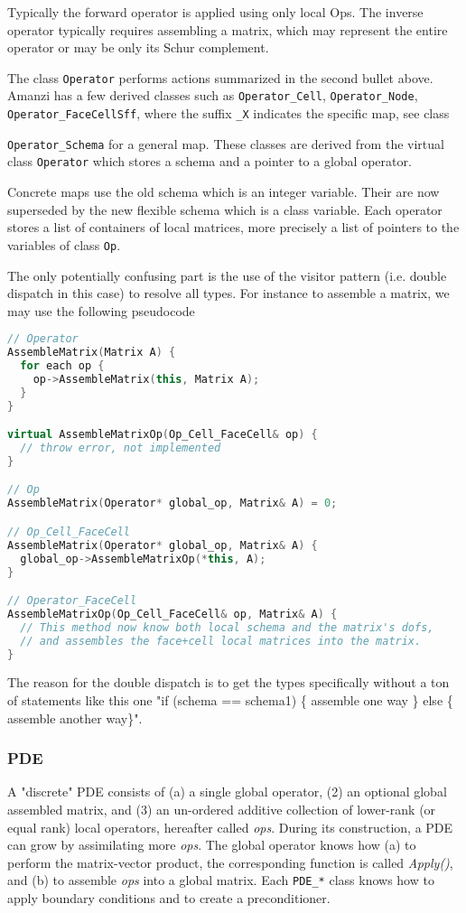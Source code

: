Typically the forward operator is applied using only local Ops.
The inverse operator typically requires assembling a matrix, which 
may represent the entire operator or may be only its Schur complement.

The class {\tt Operator} performs actions summarized in the second bullet above. 
Amanzi has a few derived classes such as {\tt Operator\_Cell}, {\tt Operator\_Node}, 
{\tt Operator\_FaceCellSff}, where the suffix {\tt \_X} indicates the specific map,
see class {{\tt Operator\_Schema} for a general map.
These classes are derived from the virtual class {\tt Operator} which stores a
schema and a pointer to a global operator.

Concrete maps use the old schema which is an integer variable.
Their are now superseded by the new flexible schema which is a class variable.
Each operator stores a list of containers of local matrices, more precisely 
a list of pointers to the variables of class {\tt Op}.

The only potentially confusing part is the use of the visitor pattern (i.e. double 
dispatch in this case) to resolve all types.  
For instance to assemble a matrix, we may use the following pseudocode

\begin{lstlisting}[language=C++]
// Operator
AssembleMatrix(Matrix A) {
  for each op {
    op->AssembleMatrix(this, Matrix A);
  }
}

virtual AssembleMatrixOp(Op_Cell_FaceCell& op) { 
  // throw error, not implemented
}

// Op
AssembleMatrix(Operator* global_op, Matrix& A) = 0;

// Op_Cell_FaceCell
AssembleMatrix(Operator* global_op, Matrix& A) {
  global_op->AssembleMatrixOp(*this, A);
}

// Operator_FaceCell
AssembleMatrixOp(Op_Cell_FaceCell& op, Matrix& A) {
  // This method now know both local schema and the matrix's dofs, 
  // and assembles the face+cell local matrices into the matrix.
}
\end{lstlisting}

The reason for the double dispatch is to get the types specifically
without a ton of statements like this one "if (schema == schema1) 
\{ assemble one way \} else \{ assemble another way\}".


\subsubsection{PDE}
A "discrete" PDE consists of (a) a single global operator, (2) an 
optional global assembled matrix, and (3) an un-ordered additive collection of 
lower-rank (or equal rank) local operators, hereafter called {\it ops}. 
During its construction, a PDE can grow by assimilating more {\it ops}. 
The global operator knows how (a) to perform the matrix-vector product, 
the corresponding function is called {\it Apply()}, and (b) to assemble {\it ops} into a global matrix.
Each {\tt PDE\_*} class knows how to apply boundary conditions and to create a preconditioner.

}

